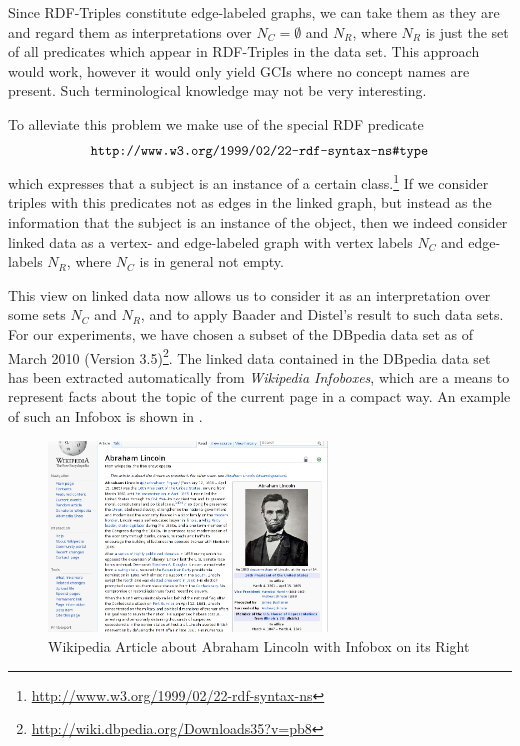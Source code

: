 Since RDF-Triples constitute edge-labeled graphs, we can take them as they are and regard
them as interpretations over $N_C = \emptyset$ and $N_R$, where $N_R$ is just the set of
all predicates which appear in RDF-Triples in the data set.  This approach would work,
however it would only yield GCIs where no concept names are present.  Such terminological
knowledge may not be very interesting.

To alleviate this problem we make use of the special RDF predicate
\begin{equation}
  \label{eq:16}
  \verb|http://www.w3.org/1999/02/22-rdf-syntax-ns#type|
\end{equation}
which expresses that a subject is an instance of a certain
class.\footnote{\url{http://www.w3.org/1999/02/22-rdf-syntax-ns}} If we consider triples
with this predicates not as edges in the linked graph, but instead as the information that
the subject is an instance of the object, then we indeed consider linked data as a vertex-
and edge-labeled graph with vertex labels $N_C$ and edge-labels $N_R$, where $N_C$ is in
general not empty.

This view on linked data now allows us to consider it as an interpretation over some sets
$N_C$ and $N_R$, and to apply Baader and Distel's result to such data sets.  For our
experiments, we have chosen a subset of the DBpedia data set as of March 2010 (Version
3.5)\footnote{\url{http://wiki.dbpedia.org/Downloads35?v=pb8}}.  The linked data contained
in the DBpedia data set has been extracted automatically from \emph{Wikipedia Infoboxes},
which are a means to represent facts about the topic of the current page in a compact way.
An example of such an Infobox is shown in .

\begin{figure}[tp]
  \centering
  \includegraphics[width=20em]{chapters/lincoln-infobox.png}
  \caption{Wikipedia Article about Abraham Lincoln with Infobox on its Right}
  \label{fig:infobox-screenshot}
\end{figure}

